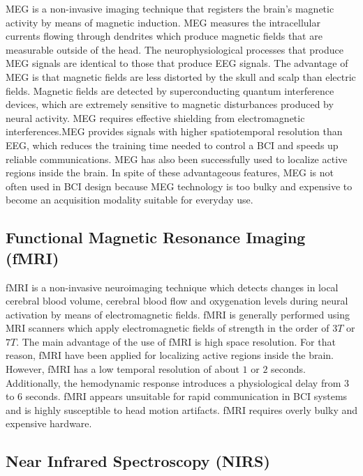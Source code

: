 MEG is a non-invasive imaging technique that registers the brain’s magnetic activity by means of magnetic induction. MEG measures the intracellular currents flowing through dendrites which produce magnetic fields that are measurable outside of the head. The neurophysiological processes that produce MEG signals are identical to those that produce EEG signals. The advantage of MEG is that magnetic fields are less distorted by the skull and scalp than electric fields. Magnetic fields are detected by superconducting quantum interference devices, which are extremely sensitive to magnetic disturbances produced by neural activity. MEG requires effective shielding from electromagnetic interferences.MEG provides signals with higher spatiotemporal resolution than EEG, which reduces the training time needed to control a BCI and speeds up reliable communications. MEG has also been successfully used to localize active regions inside the brain. In spite of these advantageous features, MEG is not often used in BCI design because MEG technology is too bulky and expensive to become an acquisition modality suitable for everyday use.

\subsection{Functional Magnetic Resonance Imaging (fMRI)}\label{ch2:5}

fMRI is a non-invasive neuroimaging technique which detects changes in local cerebral blood volume, cerebral blood flow and oxygenation levels during neural activation by means of electromagnetic fields. fMRI is generally performed using MRI scanners which apply electromagnetic fields of strength in the order of $3T$ or $7T$. The main advantage of the use of fMRI is high space resolution. For that reason, fMRI have been applied for localizing active regions inside the brain. However, fMRI has a low temporal resolution of about $1$ or $2$ seconds. Additionally, the hemodynamic response introduces a physiological delay from $3$ to $6$ seconds. fMRI appears unsuitable for rapid communication in BCI systems and is highly susceptible to head motion artifacts. fMRI requires overly bulky and expensive hardware.

\subsection{Near Infrared Spectroscopy (NIRS)}\label{ch2:5}

